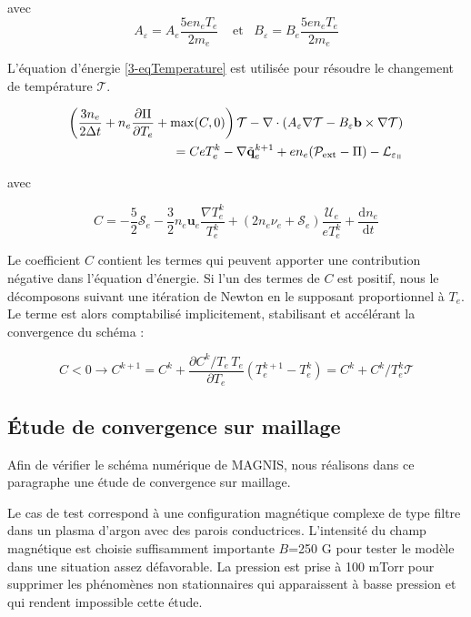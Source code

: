 \begin{refsection}
avec 
\begin{equation*}
\label{3-coefficientsChaleur}
A_\varepsilon=A_e\frac{5en_eT_e}{2m_e}\;\;\;\;\text{et}\;\;\;B_\varepsilon=B_e\frac{5en_eT_e}{2m_e}
\end{equation*}

L'équation d'énergie \eqref{3-eqTemperature} est utilisée pour résoudre le
changement de température $\mathcal T$. 

\begin{equation}
\label{3-eqTemperature2}
\begin{split}
\left(\frac{3n_e}{2\Delta
t}+n_e\frac{\partial\Pi}{\partial T_e}+\max(C,0)\right)\mathcal T
-\nabla\cdot\left(A_\varepsilon\nabla\mathcal T- B_\varepsilon\mathbf
b\times\nabla\mathcal T\right)\\ =  C eT_e^k -\nabla\tilde{\mathbf q}_e^{k+1}+
en_e(\mathcal{P}_\text{ext}-\Pi)-\mathcal L_{\varepsilon_\para}
\end{split}\end{equation}

avec 

\begin{equation*}C=-\frac{5}{2}\mathcal S_e-\frac{3}{2}n_e\mathbf
u_e\frac{\nabla
T_e^k}{T_e^k}+(2n_e\nu_e+\mathcal{S}_e)\frac{\mathcal{U}_e}{eT_e^k} +\frac{\text{d} n_e}{\text{d} t}
\end{equation*}

Le coefficient $C$ contient les termes qui peuvent apporter une contribution
négative dans l'équation d'énergie. Si l'un des
termes de $C$ est positif, nous le décomposons suivant une itération de
Newton en le supposant proportionnel à $T_e$. Le terme est alors comptabilisé
implicitement, stabilisant et accélérant la convergence du schéma
\parencite{HagelaarImpl} :

\begin{equation*}
	C<0\rightarrow C^{k+1}=C^{k}+\frac{\partial C^k/T_e\,T_e}{\partial
	T_e}(T_e^{k+1}-T_e^k)=C^{k}+ C^k/T_e^k\mathcal T
\end{equation*}

\subsection{Étude de convergence sur maillage} 
Afin de vérifier le schéma numérique de MAGNIS, nous réalisons dans ce
paragraphe une étude de convergence sur maillage. 

Le cas de test correspond à une configuration magnétique complexe de type filtre
dans un plasma d'argon avec des parois conductrices. L'intensité du
champ magnétique est choisie suffisamment importante $B$=250 G pour
tester le modèle dans une situation assez défavorable. La pression est prise à 100 mTorr
pour supprimer les phénomènes non stationnaires qui apparaissent à basse
pression et qui rendent impossible cette étude.


\end{refsection}
